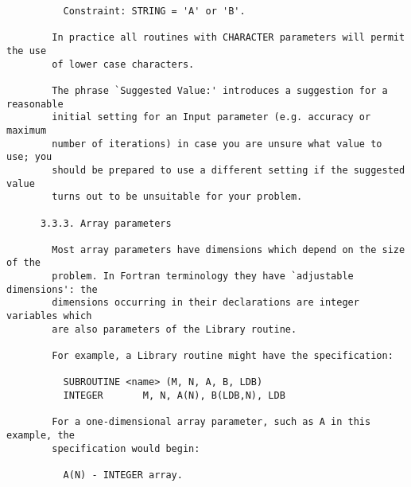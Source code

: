 \begin{small}
\begin{verbatim}
          Constraint: STRING = 'A' or 'B'.                                        
                                                                                  
        In practice all routines with CHARACTER parameters will permit the use    
        of lower case characters.                                                 
                                                                                  
        The phrase `Suggested Value:' introduces a suggestion for a reasonable    
        initial setting for an Input parameter (e.g. accuracy or maximum          
        number of iterations) in case you are unsure what value to use; you       
        should be prepared to use a different setting if the suggested value      
        turns out to be unsuitable for your problem.                              
                                                                                  
      3.3.3. Array parameters                                                     
                                                                                  
        Most array parameters have dimensions which depend on the size of the     
        problem. In Fortran terminology they have `adjustable dimensions': the    
        dimensions occurring in their declarations are integer variables which    
        are also parameters of the Library routine.                               
                                                                                  
        For example, a Library routine might have the specification:              
                                                                                  
          SUBROUTINE <name> (M, N, A, B, LDB)                                     
          INTEGER       M, N, A(N), B(LDB,N), LDB                                 
                                                                                  
        For a one-dimensional array parameter, such as A in this example, the     
        specification would begin:                                                
                                                                                  
          A(N) - INTEGER array.                                                   
                                                                                  

\end{verbatim}
\end{small}
